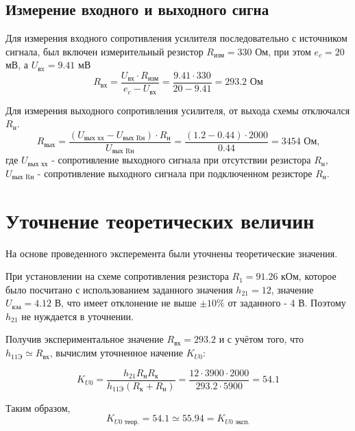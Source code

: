 \subsection{Измерение входного и выходного сигна}

Для измерения входного сопротивления усилителя последовательно с источником сигнала, был включен измерительный резистор $R_\text{изм} = 330$ Ом, при этом $e_c = 20$ мВ, а $U_\text{вx} = 9.41$ мВ
\begin{equation}
R_\text{вх} = \frac{U_\text{вх} \cdot R_\text{изм}}{e_c - U_\text{вх}} = \frac{9.41 \cdot 330}{20 - 9.41} = 293.2 \text{ Ом}
\end{equation}

Для измерения выходного сопротивления усилителя, от выхода схемы отключался $R_\text{н}$.
\begin{equation}
R_\text{вых} = \frac{(U_\text{вых хх} - U_\text{вых Rн}) \cdot R_\text{н}}{U_\text{вых Rн}} = \frac{(1.2 - 0.44) \cdot 2000}{0.44} = 3454 \text{ Ом,}
\end{equation}
где $U_\text{вых хх}$ - сопротивление выходного сигнала при отсутствии резистора $R_\text{н}$, $U_\text{вых Rн}$ - сопротивление выходного сигнала при подключенном резисторе $R_\text{н}$.

\section{Уточнение теоретических величин}

На основе проведенного эксперемента были уточнены теоретические значения.

При установлении на схеме сопротивления резистора $R_1 = 91.26$ кОм, которое было посчитано с использованием заданного значения $h_21 = 12$, значение $U_\text{кэа} = 4.12$ В, что имеет отклонение не выше $\pm 10 \%$ от заданного - 4 В. Поэтому $h_21$ не нуждается в уточнении.


Получив экспериментальное значение $R_\text{вх} = 293.2$ и с учётом того, что $h_{11\text{Э}} \simeq R_\text{вх}$, вычислим уточненное начение $K_{U0}$: 

\begin{equation*}
K_{U0} = \frac{h_{21}R_\text{н}R_\text{к}}{h_\text{11Э}(R_\text{к}+R_\text{н})} = \frac{12 \cdot 3900 \cdot 2000}{293.2 \cdot 5900} = 54.1
\end{equation*}

Таким образом, 
\begin{equation*}
K_{U0\text{ теор.}} = 54.1 \simeq 55.94 = K_{U0\text{ эксп.}}
\end{equation*}

